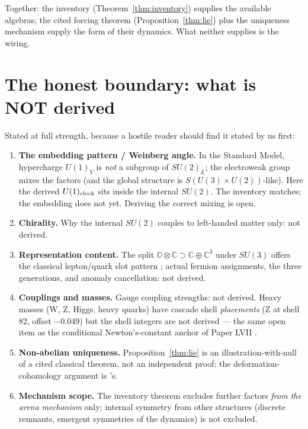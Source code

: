 \documentclass[12pt]{article}
\theoremstyle{definition}
\theoremstyle{remark}
\newcommand{\Oc}{\mathbb{O}}
\begin{document}
Together: the inventory (Theorem~\ref{thm:inventory}) supplies the available algebras; the cited forcing theorem (Proposition~\ref{thm:lie}) plus the uniqueness mechanism supply the form of their dynamics. What neither supplies is the wiring.

\section{The honest boundary: what is NOT derived}\label{sec:honest}

Stated at full strength, because a hostile reader should find it stated by us first:

\begin{enumerate}
\item \textbf{The embedding pattern / Weinberg angle.} In the Standard Model, hypercharge $U(1)_Y$ is \emph{not} a subgroup of $SU(2)_L$; the electroweak group mixes the factors (and the global structure is $S(U(3){\times}U(2))$-like). Here the derived $U(1)_{\rm clock}$ sits inside the internal $SU(2)$. The inventory matches; the embedding does not yet. Deriving the correct mixing is open.
\item \textbf{Chirality.} Why the internal $SU(2)$ couples to left-handed matter only: not derived.
\item \textbf{Representation content.} The split $\Oc\otimes\mathbb C \supset \mathbb C \oplus \mathbb C^3$ under $SU(3)$ offers the classical lepton/quark slot pattern \citep{GunaydinGursey1973}; actual fermion assignments, the three generations, and anomaly cancellation: not derived.
\item \textbf{Couplings and masses.} Gauge coupling strengths: not derived. Heavy masses (W, Z, Higgs, heavy quarks) have cascade shell \emph{placements} (Z at shell 82, offset $-0.049$) but the shell integers are not derived --- the same open item as the conditional Newton's-constant anchor of Paper LVII \citep{SmartLVII}.
\item \textbf{Non-abelian uniqueness.} Proposition~\ref{thm:lie} is an illustration-with-null of a cited classical theorem, not an independent proof; the deformation-cohomology argument is \citet{BarnichHenneaux1993}'s.
\item \textbf{Mechanism scope.} The inventory theorem excludes further factors \emph{from the arena mechanism} only; internal symmetry from other structures (discrete remnants, emergent symmetries of the dynamics) is not excluded.
\end{enumerate}
\end{document}
